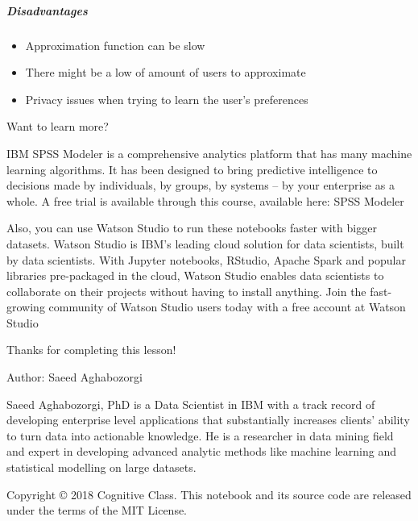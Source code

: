 \documentclass[11pt]{article}
\providecommand{\tightlist}{%
      \setlength{\itemsep}{0pt}\setlength{\parskip}{0pt}}
\begin{document}
\hypertarget{disadvantages}{%
\subparagraph{Disadvantages}\label{disadvantages}}

\begin{itemize}
\tightlist
\item
  Approximation function can be slow
\item
  There might be a low of amount of users to approximate
\item
  Privacy issues when trying to learn the user's preferences
\end{itemize}

    Want to learn more?

IBM SPSS Modeler is a comprehensive analytics platform that has many
machine learning algorithms. It has been designed to bring predictive
intelligence to decisions made by individuals, by groups, by systems --
by your enterprise as a whole. A free trial is available through this
course, available here: SPSS Modeler

Also, you can use Watson Studio to run these notebooks faster with
bigger datasets. Watson Studio is IBM's leading cloud solution for data
scientists, built by data scientists. With Jupyter notebooks, RStudio,
Apache Spark and popular libraries pre-packaged in the cloud, Watson
Studio enables data scientists to collaborate on their projects without
having to install anything. Join the fast-growing community of Watson
Studio users today with a free account at Watson Studio

Thanks for completing this lesson!

Author: Saeed Aghabozorgi

Saeed Aghabozorgi, PhD is a Data Scientist in IBM with a track record of
developing enterprise level applications that substantially increases
clients' ability to turn data into actionable knowledge. He is a
researcher in data mining field and expert in developing advanced
analytic methods like machine learning and statistical modelling on
large datasets.

Copyright © 2018 Cognitive Class. This notebook and its source code are
released under the terms of the MIT License.


    
    
    
\end{document}
